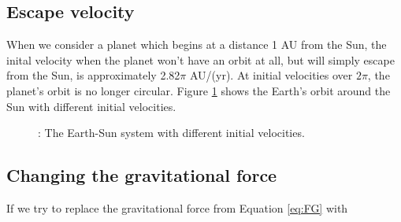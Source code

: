 \documentclass{article}
\begin{document}
    \subsection{Escape velocity}
        When we consider a planet which begins at a distance 1 AU from the Sun, the inital velocity when the planet won't have an orbit at all, but will simply escape from the Sun, is approximately 2.82$\pi$ AU/(yr). At initial velocities over $2\pi$, the planet's orbit is no longer circular. Figure \ref{fig:last} shows the Earth's orbit around the Sun with different initial velocities.

        \begin{figure}[H]
            \caption{: The Earth-Sun system with different initial velocities.}
            \label{fig:last}
        \end{figure}


    \subsection{Changing the gravitational force}
        If we try to replace the gravitational force from Equation \ref{eq:FG} with
\end{document}
